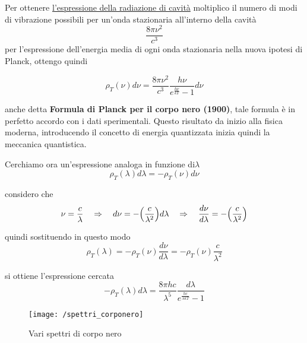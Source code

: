Per ottenere \underline{l'espressione della radiazione di cavità} moltiplico il numero di modi di vibrazione possibili per un'onda stazionaria all'interno della cavità
$$\frac{ 8\pi\nu^2}{c^3 }$$
per l'espressione dell'energia media di ogni onda stazionaria nella nuova ipotesi di Planck, ottengo quindi

\begin{equation}
\rho_T(\nu) d\nu = \frac{ 8\pi\nu^2}{c^3 } \frac{ h\nu}{ e^{ \frac{ h\nu}{kT }} - 1} d\nu
\end{equation}

anche detta \textbf{Formula di Planck per il corpo nero (1900)}, tale formula è in perfetto accordo con i dati sperimentali.
Questo risultato da inizio alla fisica moderna, introducendo il concetto di energia quantizzata inizia quindi la meccanica quantistica.

Cerchiamo ora un'espressione analoga in funzione di$\lambda$
$$\rho_T(\lambda) d\lambda = -\rho_T(\nu)d\nu $$

considero che
$$\nu = \frac{ c}{\lambda } \quad \Rightarrow \quad d\nu = -\Bigl(  \frac{ c}{\lambda^2 }  \Bigr) d\lambda \quad \Rightarrow \quad \frac{ d\nu}{d\lambda } = -\Bigl(  \frac{ c}{\lambda^2 }  \Bigr) $$

quindi sostituendo in questo modo
$$\rho_T(\lambda) = -\rho_T(\nu) \frac{ d\nu}{d\lambda } = -\rho_T(\nu) \frac{ c}{\lambda^2 }$$

si ottiene l'espressione cercata
\begin{equation}
-\rho_T(\lambda) d\lambda = \frac{ 8\pi h c }{\lambda^5 } \frac{ d\lambda}{e^{ \frac{ hc}{\lambda k T } } -1 }
\end{equation}

\begin{figure}[h]
\centering
\texttt{[image: /spettri\_corponero]}
\caption{Vari spettri di corpo nero}
\end{figure}

